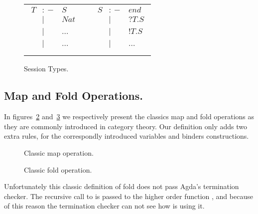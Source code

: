 \documentclass{book}
\begin{document}
\begin{figure}[h!]
  \centering
  \begin{tabular}{ccc}


    $\begin{array}{lcl}
      T &{:\!\!-}& S  \\
      &|&  Nat \\
      &|& \dots \\ 
      &|& \dots \\
    \end{array}$
    &      &
    $\begin{array}{lcl}
      S  &{:\!\!-}& \mathit{end}  \\
      &|& ?T.S    \\
      &|& !T.S    \\
      &|& \dots \\
    \end{array}$ \\

  \end{tabular}
  
  \caption{Session Types.}
\label{fig:sessiontypes}
\end{figure}



\subsection{Map and Fold Operations.}
\label{sec:map-fold}

In figures~\ref{fig:fold} and~\ref{fig:fold2} we respectively present the classics map and fold operations as they are commonly introduced in category theory. Our definition only adds two extra rules, for the correspondly introduced variables and binders constructions.

\begin{figure}[h!]
\caption{Classic map operation.}
\label{fig:fold}
\end{figure}

\begin{figure}[h!]
\caption{Classic fold operation.}
\label{fig:fold2}
\end{figure}


Unfortunately this classic definition of fold does not pass Agda's termination checker. The recursive call to  is passed to the higher order function , and because of this reason the termination checker can not see how  is using it. 
\end{document}
